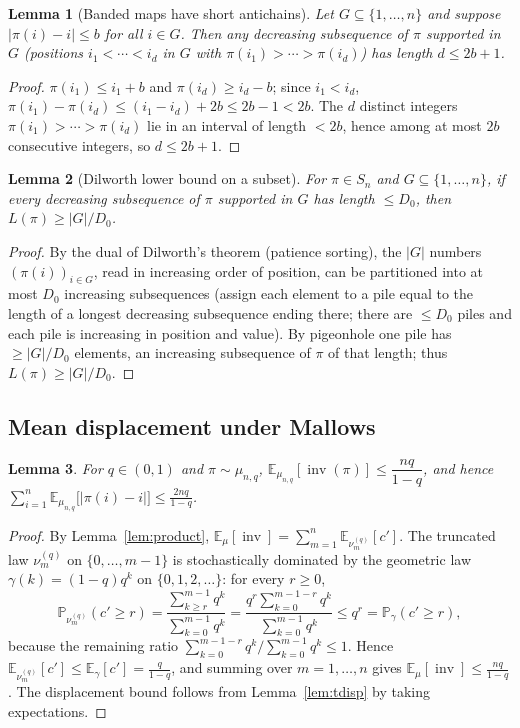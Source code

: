 \documentclass[12pt]{article}
\newtheorem{lemma}{Lemma}
\theoremstyle{definition}
\DeclareMathOperator{\inv}{inv}
\newcommand{\E}{\mathbb{E}}
\newcommand{\PP}{\mathbb{P}}
\begin{document}
\begin{lemma}[Banded maps have short antichains]\label{lem:band}
Let $G\subseteq\{1,\dots,n\}$ and suppose $|\pi(i)-i|\le b$ for all $i\in G$. Then any
decreasing subsequence of $\pi$ supported in $G$ (positions $i_1<\cdots<i_d$ in $G$ with
$\pi(i_1)>\cdots>\pi(i_d)$) has length $d\le 2b+1$.
\end{lemma}
\begin{proof}
$\pi(i_1)\le i_1+b$ and $\pi(i_d)\ge i_d-b$; since $i_1<i_d$,
$\pi(i_1)-\pi(i_d)\le (i_1-i_d)+2b\le 2b-1<2b$. The $d$ distinct integers
$\pi(i_1)>\cdots>\pi(i_d)$ lie in an interval of length $<2b$, hence among at most $2b$
consecutive integers, so $d\le 2b+1$.
\end{proof}

\begin{lemma}[Dilworth lower bound on a subset]\label{lem:dilworth}
For $\pi\in S_n$ and $G\subseteq\{1,\dots,n\}$, if every decreasing subsequence of $\pi$
supported in $G$ has length $\le D_0$, then $L(\pi)\ge |G|/D_0$.
\end{lemma}
\begin{proof}
By the dual of Dilworth's theorem (patience sorting), the $|G|$ numbers
$(\pi(i))_{i\in G}$, read in increasing order of position, can be partitioned into at
most $D_0$ increasing subsequences (assign each element to a pile equal to the length of
a longest decreasing subsequence ending there; there are $\le D_0$ piles and each pile
is increasing in position and value). By pigeonhole one pile has $\ge |G|/D_0$ elements,
an increasing subsequence of $\pi$ of that length; thus $L(\pi)\ge |G|/D_0$.
\end{proof}

\subsection{Mean displacement under Mallows}
\begin{lemma}\label{lem:Einv}
For $q\in(0,1)$ and $\pi\sim\mu_{n,q}$, $\E_{\mu_{n,q}}[\inv(\pi)]\le \dfrac{nq}{1-q}$, and
hence $\displaystyle\sum_{i=1}^n\E_{\mu_{n,q}}\big[|\pi(i)-i|\big]\le\frac{2nq}{1-q}$.
\end{lemma}
\begin{proof}
By Lemma~\ref{lem:product}, $\E_\mu[\inv]=\sum_{m=1}^n\E_{\nu^{(q)}_m}[c']$. The
truncated law $\nu^{(q)}_m$ on $\{0,\dots,m-1\}$ is stochastically dominated by the
geometric law $\gamma(k)=(1-q)q^k$ on $\{0,1,2,\dots\}$: for every $r\ge0$,
\[
\PP_{\nu^{(q)}_m}(c'\ge r)=\frac{\sum_{k\ge r}^{m-1}q^k}{\sum_{k=0}^{m-1}q^k}
=\frac{q^{r}\sum_{k=0}^{m-1-r}q^{k}}{\sum_{k=0}^{m-1}q^{k}}\le q^{r}=\PP_{\gamma}(c'\ge r),
\]
because the remaining ratio $\sum_{k=0}^{m-1-r}q^k/\sum_{k=0}^{m-1}q^k\le1$. Hence
$\E_{\nu^{(q)}_m}[c']\le \E_\gamma[c']=\tfrac{q}{1-q}$, and summing over $m=1,\dots,n$
gives $\E_\mu[\inv]\le \tfrac{nq}{1-q}$. The displacement bound follows from
Lemma~\ref{lem:tdisp} by taking expectations.
\end{proof}
\end{document}
